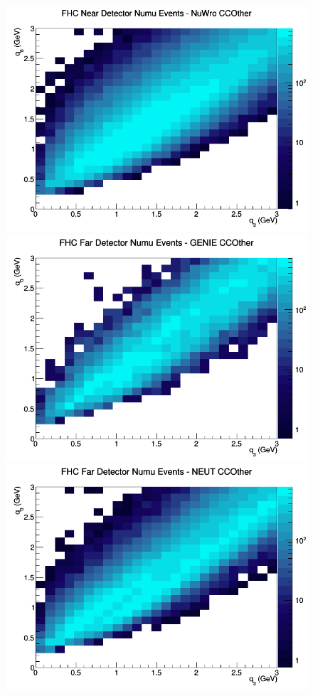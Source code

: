 \documentclass[12pt]{article}
\begin{document}
\begin{figure}[h]
\includegraphics[width=\linewidth]{eff_q0_q3/GAr/CCOther_FHC_ND_numu_q3_q0_NuWro.png}
\endminipage
\newline
{}
\includegraphics[width=\linewidth]{eff_q0_q3/GAr/CCOther_FHC_FD_numu_q3_q0_GENIE.png}
\endminipage
{}
\includegraphics[width=\linewidth]{eff_q0_q3/GAr/CCOther_FHC_FD_numu_q3_q0_NEUT.png}

\end{figure}
\end{document}
